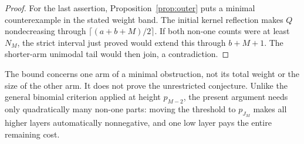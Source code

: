 \begin{proof}
For the last assertion, Proposition~\ref{prop:outer} puts a minimal counterexample in the stated weight band. The initial kernel reflection makes $Q$ nondecreasing through $\lceil(a+b+M)/2\rceil$. If both non-one counts were at least $N_M$, the strict interval just proved would extend this through $b+M+1$. The shorter-arm unimodal tail would then join, a contradiction.
\end{proof}

The bound concerns one arm of a minimal obstruction, not its total weight or the size of the other arm. It does not prove the unrestricted conjecture. Unlike the general binomial criterion applied at height $p_{M-2}$, the present argument needs only quadratically many non-one parts: moving the threshold to $p_{J_M}$ makes all higher layers automatically nonnegative, and one low layer pays the entire remaining cost.

